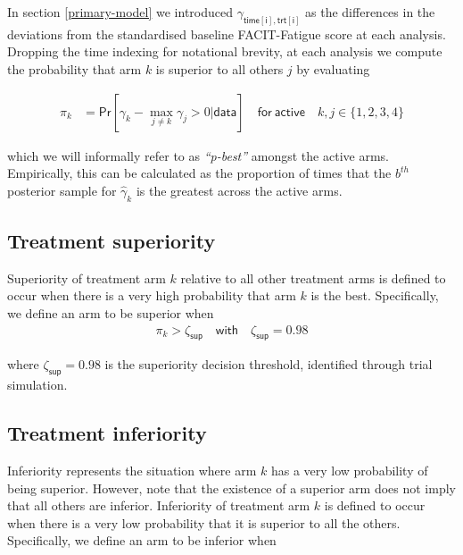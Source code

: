 \documentclass[
]{article}
\begin{document}
In section \ref{primary-model} we introduced $\gamma_{\mathsf{time[i], trt[i]}}$ as the differences in the deviations from the standardised baseline FACIT-Fatigue score at each analysis.
Dropping the time indexing for notational brevity, at each analysis we compute the probability that arm $k$ is superior to all others $j$ by evaluating

\[
  \begin{aligned}
    \pi_{k} & = \mathsf{Pr}[\gamma_{k} - \max_{j\ne k} \gamma_j >0|\mathsf{data}] \quad \mathsf{for \  active} \quad k,j \in \{1, 2, 3, 4\}
  \end{aligned}
\]

which we will informally refer to as \textit{``p-best''} amongst the active arms.
Empirically, this can be calculated as the proportion of times that the $b^{th}$ posterior sample for $\widehat{\gamma}_k$ is the greatest across the active arms.

\hypertarget{treatment-superiority}{%
  \subsection{Treatment superiority}\label{treatment-superiority}}

Superiority of treatment arm $k$ relative to all other treatment arms is defined to occur when there is a very high probability that arm $k$ is the best.
Specifically, we define an arm to be superior when
\[
  \begin{aligned}
    \pi_{k} > \zeta_{\mathsf{sup}} \quad \mathsf{with} \quad \zeta_{\mathsf{sup}} = 0.98
  \end{aligned}
\]

where $\zeta_{\mathsf{sup}} = 0.98$ is the superiority decision threshold, identified through trial simulation.

\hypertarget{treatment-inferiority}{%
  \subsection{Treatment inferiority}\label{treatment-inferiority}}

Inferiority represents the situation where arm $k$ has a very low probability of being superior.
However, note that the existence of a superior arm does not imply that all others are inferior.
Inferiority of treatment arm $k$ is defined to occur when there is a very low probability that it is superior to all the others.
Specifically, we define an arm to be inferior when
\end{document}

